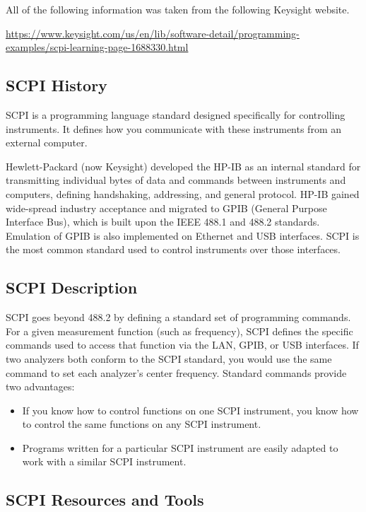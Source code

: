 \documentclass{article}
\begin{document}
All of the following information was taken from the following Keysight website.

\begin{center}
    \url{https://www.keysight.com/us/en/lib/software-detail/programming-examples/scpi-learning-page-1688330.html}
\end{center}

\subsection*{SCPI History}

SCPI is a programming language standard designed specifically for controlling instruments. It defines how you communicate with these instruments from an external computer.

Hewlett-Packard (now Keysight) developed the HP-IB as an internal standard for transmitting individual bytes of data and commands between instruments and computers, defining handshaking, addressing, and general protocol. HP-IB gained wide-spread industry acceptance and migrated to GPIB (General Purpose Interface Bus), which is built upon the IEEE 488.1 and 488.2 standards. Emulation of GPIB is also implemented on Ethernet and USB interfaces. SCPI is the most common standard used to control instruments over those 
interfaces.

\subsection*{SCPI Description}

SCPI goes beyond 488.2 by defining a standard set of programming commands. For a given measurement function (such as frequency), SCPI defines the specific commands used to access that function via the LAN, GPIB, or USB interfaces. If two analyzers both conform to the SCPI standard, you would use the same command to set each analyzer’s center frequency. Standard commands provide two advantages:

\begin{itemize}
    \item If you know how to control functions on one SCPI instrument, you know how to control the same functions on any SCPI instrument.
    \item Programs written for a particular SCPI instrument are easily adapted to work with a similar SCPI instrument.
\end{itemize}

\subsection*{SCPI Resources and Tools}
\end{document}
